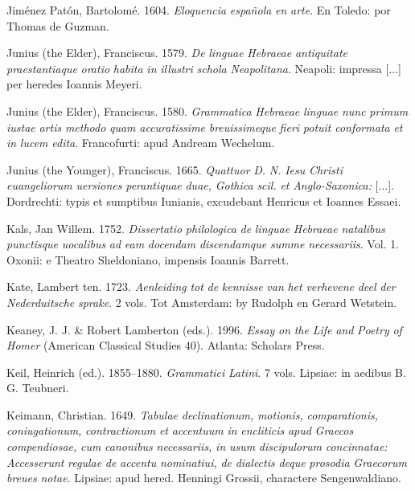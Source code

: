 Jiménez Patón, Bartolomé. 1604. \textit{Eloquencia} \textit{española} \textit{en} \textit{arte}. En Toledo: por Thomas de Guzman.

Junius (the Elder), Franciscus. 1579. \textit{De} \textit{linguae} \textit{Hebraeae} \textit{antiquitate} \textit{praestantiaque} \textit{oratio} \textit{habita} \textit{in} \textit{illustri} \textit{schola} \textit{Neapolitana}. Neapoli: impressa [...] per heredes Ioannis Meyeri.

Junius (the Elder), Franciscus. 1580. \textit{Grammatica} \textit{Hebraeae} \textit{linguae} \textit{nunc} \textit{primum} \textit{iustae} \textit{artis} \textit{methodo} \textit{quam} \textit{accuratissime} \textit{breuissimeque} \textit{fieri} \textit{potuit} \textit{conformata} \textit{et} \textit{in} \textit{lucem} \textit{edita}. Francofurti: apud Andream Wechelum.

Junius (the Younger), Franciscus. 1665. \textit{Quattuor} \textit{D.} \textit{N.} \textit{Iesu} \textit{Christi} \textit{euangeliorum} \textit{uersiones} \textit{perantiquae} \textit{duae,} \textit{Gothica} \textit{scil.} \textit{et} \textit{Anglo-Saxonica:} [...]. Dordrechti: typis et sumptibus Iunianis, excudebant Henricus et Ioannes Essaei.

Kals, Jan Willem. 1752. \textit{Dissertatio} \textit{philologica} \textit{de} \textit{linguae} \textit{Hebraeae} \textit{natalibus} \textit{punctisque} \textit{uocalibus} \textit{ad} \textit{eam} \textit{docendam} \textit{discendamque} \textit{summe} \textit{necessariis}. Vol. 1. Oxonii: e Theatro Sheldoniano, impensis Ioannis Barrett.

Kate, Lambert ten. 1723. \textit{Aenleiding} \textit{tot} \textit{de} \textit{kennisse} \textit{van} \textit{het} \textit{verhevene} \textit{deel} \textit{der} \textit{Nederduitsche} \textit{sprake}. 2 vols. Tot Amsterdam: by Rudolph en Gerard Wetstein.

Keaney, J. J. \& Robert Lamberton (eds.). 1996. \textit{Essay} \textit{on} \textit{the} \textit{Life} \textit{and} \textit{Poetry} \textit{of} \textit{Homer} (American Classical Studies 40). Atlanta: Scholars Press.

Keil, Heinrich (ed.). 1855–1880. \textit{Grammatici} \textit{Latini}. 7 vols. Lipsiae: in aedibus B. G. Teubneri.

Keimann, Christian. 1649. \textit{Tabulae} \textit{declinationum,} \textit{motionis,} \textit{comparationis,} \textit{coniugationum,} \textit{contractionum} \textit{et} \textit{accentuum} \textit{in} \textit{encliticis} \textit{apud} \textit{Graecos} \textit{compendiosae,} \textit{cum} \textit{canonibus} \textit{necessariis,} \textit{in} \textit{usum} \textit{discipulorum} \textit{concinnatae:} \textit{Accesserunt} \textit{regulae} \textit{de} \textit{accentu} \textit{nominatiui,} \textit{de} \textit{dialectis} \textit{deque} \textit{prosodia} \textit{Graecorum} \textit{breues} \textit{notae}. Lipsiae: apud hered. Henningi Grossii, charactere Sengenwaldiano.

